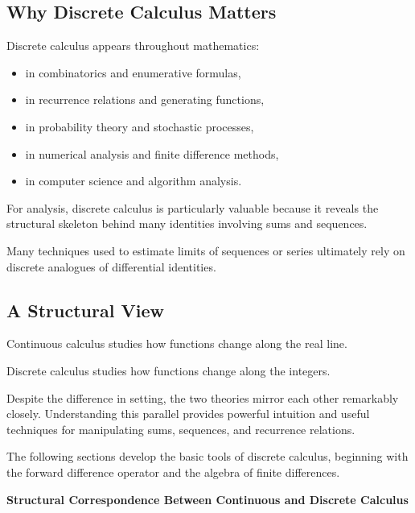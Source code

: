 \subsection*{Why Discrete Calculus Matters}

\begin{exposition}
Discrete calculus appears throughout mathematics:

\begin{itemize}
\item in combinatorics and enumerative formulas,
\item in recurrence relations and generating functions,
\item in probability theory and stochastic processes,
\item in numerical analysis and finite difference methods,
\item in computer science and algorithm analysis.
\end{itemize}

For analysis, discrete calculus is particularly valuable because it
reveals the structural skeleton behind many identities involving sums and
sequences.

Many techniques used to estimate limits of sequences or series ultimately rely
on discrete analogues of differential identities.
\end{exposition}

\subsection*{A Structural View}

\begin{exposition}
Continuous calculus studies how functions change along the real line.

Discrete calculus studies how functions change along the integers.

Despite the difference in setting, the two theories mirror each other
remarkably closely. Understanding this parallel provides powerful intuition and
useful techniques for manipulating sums, sequences, and recurrence relations.

The following sections develop the basic tools of discrete calculus,
beginning with the forward difference operator and the algebra of finite
differences.
\end{exposition}

\begin{center}
\textbf{Structural Correspondence Between Continuous and Discrete Calculus}
\end{center}

\begin{center}

\end{center}



